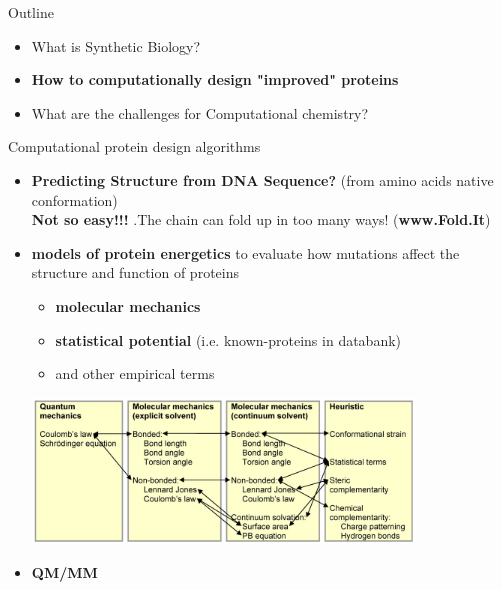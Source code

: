 \begin{frame}{Outline}
\footnotesize
\begin{itemize}
\item What is Synthetic Biology?
\item \textbf{How to computationally design "improved" proteins}
\item What are the challenges for Computational chemistry?
\end{itemize}
\end{frame}


\begin{frame}{Computational protein design algorithms}
\footnotesize
\begin{itemize}
\item \textbf{Predicting Structure from DNA Sequence?} (from amino acids native conformation)  \\
	\textbf{Not so easy!!!} .The chain can fold up in too many ways! (\textbf{www.Fold.It})
\item \textbf{models of protein energetics} to evaluate how mutations affect the structure and function of proteins 
    \begin{itemize}
\footnotesize
    \item \textbf{molecular mechanics}
    \item \textbf{statistical potential} (i.e. known-proteins in databank)
    \item and other empirical terms
    \end{itemize}

\begin{center}
\includegraphics[width=0.8\textwidth]{./images/PEF_comparison.png}
\end{center}
\item  \textbf{QM/MM}
\end{itemize}

\end{frame}


